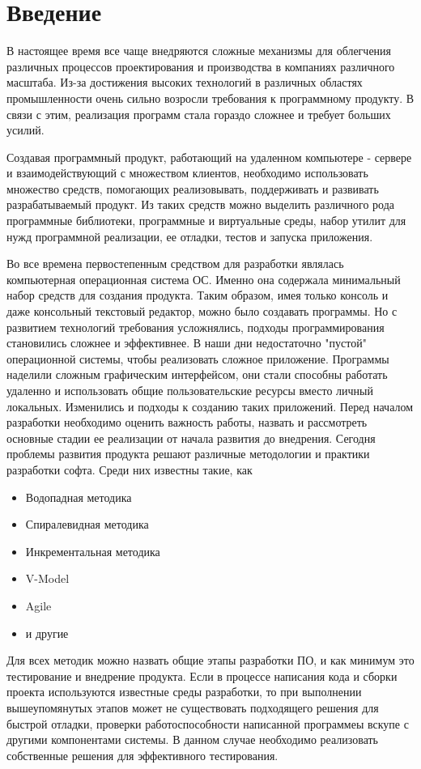 \section{Введение}
В настоящее время все чаще внедряются сложные механизмы для облегчения различных процессов проектирования и производства в компаниях различного масштаба. Из-за достижения высоких технологий в различных областях промышленности очень сильно возросли требования к программному продукту. В связи с этим, реализация программ стала гораздо сложнее и требует больших усилий. 

Создавая программный продукт, работающий на удаленном компьютере - сервере и взаимодействующий с множеством клиентов, необходимо использовать множество средств, помогающих реализовывать, поддерживать и развивать разрабатываемый продукт. Из таких средств можно выделить различного рода программные библиотеки, программные и виртуальные среды, набор утилит для нужд программной реализации, ее отладки, тестов и запуска приложения.

Во все времена первостепенным средством для разработки являлась компьютерная операционная система ОС. Именно она содержала минимальный набор средств для создания продукта. Таким образом, имея только консоль и даже консольный текстовый редактор, можно было создавать программы. 
Но с развитием технологий требования усложнялись, подходы программирования становились сложнее и эффективнее. В наши дни недостаточно "пустой" операционной системы, чтобы реализовать сложное приложение. Программы наделили сложным графическим интерфейсом, они стали способны работать удаленно и использовать общие пользовательские ресурсы вместо личный локальных.
Изменились и подходы к созданию таких приложений. Перед началом разработки необходимо оценить важность работы, назвать и рассмотреть основные стадии ее реализации от начала развития до внедрения. Сегодня проблемы развития продукта решают различные методологии и практики разработки софта. 
Среди них известны такие, как 
\begin{itemize}
\item Водопадная методика
\item Спиралевидная методика
\item Инкрементальная методика
\item V-Model 
\item Agile
\item и другие
\end{itemize}
Для всех методик можно назвать общие этапы разработки ПО, и как минимум это тестирование и внедрение продукта. Если в процессе написания кода и сборки проекта используются известные среды разработки, то при выполнении вышеупомянутых этапов может не существовать подходящего решения для быстрой отладки, проверки работоспособности написанной программеы вскупе с другими компонентами системы. В данном случае необходимо реализовать собственные решения для эффективного тестирования.